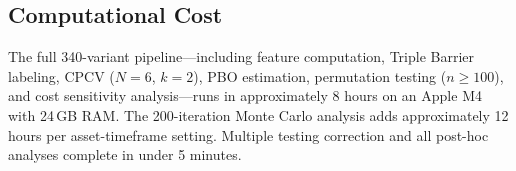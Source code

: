 \documentclass[sigconf,anonymous,review]{acmart}
\begin{document}
\subsection{Computational Cost}

The full 340-variant pipeline---including feature computation,
Triple Barrier labeling, CPCV ($N=6$, $k=2$), PBO estimation,
permutation testing ($n \geq 100$), and cost sensitivity
analysis---runs in approximately 8 hours on an Apple M4 with
24\,GB RAM. The 200-iteration Monte Carlo analysis adds
approximately 12 hours per asset-timeframe setting. Multiple
testing correction and all post-hoc analyses complete in under
5 minutes.
\end{document}
